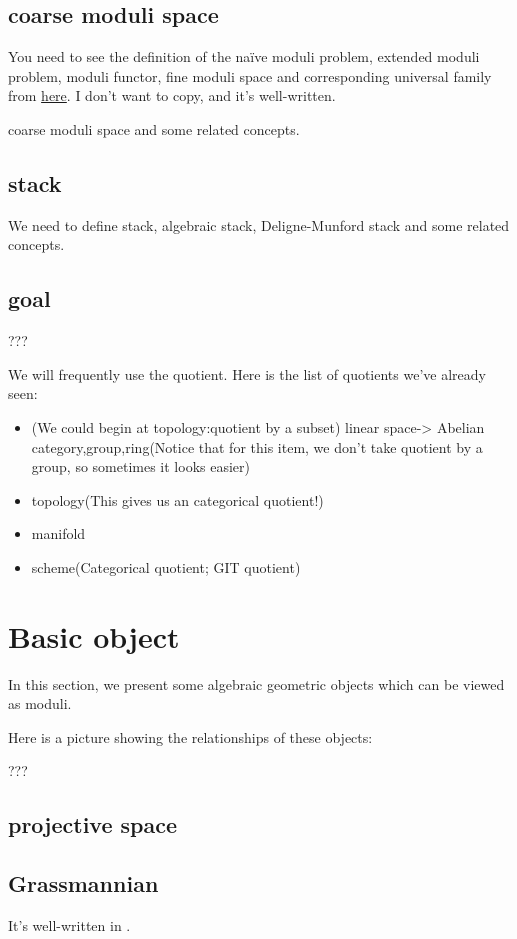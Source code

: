 \documentclass[reqno,11pt]{amsart}
\numberwithin{equation}{section}
\theoremstyle{plain}
\theoremstyle{plain}
\numberwithin{equation}{section}
\theoremstyle{remark}
\begin{document}
\subsection{coarse moduli space}
You need to see the definition of the naïve moduli problem, extended moduli problem, moduli functor, fine moduli space and corresponding universal family from  \href{https://userpage.fu-berlin.de/hoskins/moduli_and_GIT.html}{here}. I don't want to copy, and it's well-written.

coarse moduli space and some related concepts. 
\subsection{stack}
We need to define stack, algebraic stack, Deligne-Munford stack and some related concepts.
\subsection{goal}
???

We will frequently use the quotient. Here is the list of quotients we've already seen:
\begin{itemize}
\item (We could begin at topology:quotient by a subset) linear space-> Abelian category,group,ring(Notice that for this item, we don't take quotient by a group, so sometimes it looks easier)
\item topology(This gives us an categorical quotient!)
\item manifold
\item scheme(Categorical quotient; GIT quotient)
\end{itemize}
\section{Basic object}
In this section, we present some algebraic geometric objects which can be viewed as moduli.

Here is a picture showing the relationships of these objects:

???
\subsection{projective space}
\subsection{Grassmannian}
It's well-written in \cite[16.7]{FOAG}.
\end{document}
